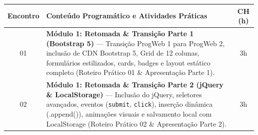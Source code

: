 \documentclass[12pt,a4paper]{article}
\begin{document}
\begin{table}[H]
\centering
\small
\begin{tabularx}{\textwidth}{|c|X|c|}
\hline
\rowcolor{cinzaCabecalho}
\textbf{Encontro} & \textbf{Conteúdo Programático e Atividades Práticas} & \textbf{CH (h)} \\ \hline
\rowcolor{cinzaLinha}
01 & \textbf{Módulo 1: Retomada \& Transição Parte 1 (Bootstrap 5)} — Transição ProgWeb 1 para ProgWeb 2, inclusão de CDN Bootstrap 5, Grid de 12 colunas, formulários estilizados, cards, badges e layout estático completo (Roteiro Prático 01 \& Apresentação Parte 1). & 3h \\ \hline
02 & \textbf{Módulo 1: Retomada \& Transição Parte 2 (jQuery \& LocalStorage)} — Inclusão do jQuery, seletores avançados, eventos (\texttt{submit}, \texttt{click}), inserção dinâmica (.append()), animações visuais e salvamento local com LocalStorage (Roteiro Prático 02 \& Apresentação Parte 2). & 3h \\ \hline


\end{tabularx}
\end{table}
\end{document}

